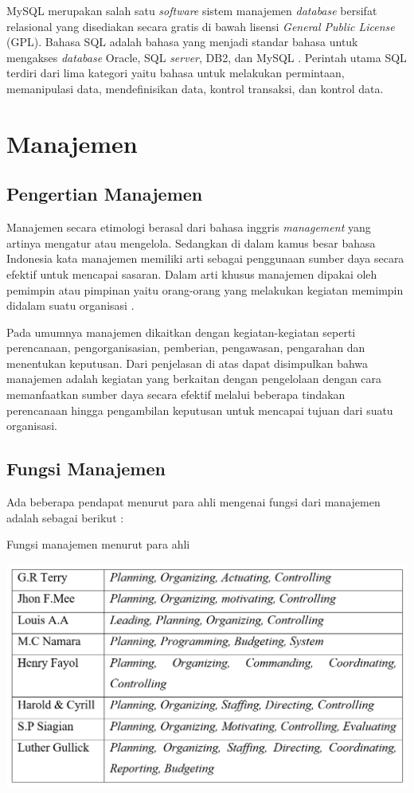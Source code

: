 MySQL merupakan salah satu \emph{software} sistem manajemen \emph{database} bersifat relasional yang disediakan secara gratis di bawah lisensi \emph{General Public License} (GPL). Bahasa SQL adalah bahasa yang menjadi standar bahasa untuk mengakses \emph{database} Oracle, SQL \emph{server}, DB2, dan MySQL \cite{andreea}. Perintah utama SQL terdiri dari lima kategori yaitu bahasa untuk melakukan permintaan, memanipulasi data, mendefinisikan data, kontrol transaksi, dan kontrol data. 

\section{Manajemen}

\subsection{Pengertian Manajemen}

Manajemen secara etimologi berasal dari bahasa inggris \emph{management} yang artinya mengatur atau mengelola. Sedangkan di dalam kamus besar bahasa Indonesia kata manajemen memiliki arti sebagai penggunaan sumber daya secara efektif untuk mencapai sasaran. Dalam arti khusus manajemen dipakai oleh pemimpin atau pimpinan yaitu orang-orang yang melakukan kegiatan memimpin didalam suatu organisasi \cite{syamsuddin}. 

Pada umumnya manajemen dikaitkan dengan kegiatan-kegiatan seperti perencanaan, pengorganisasian, pemberian, pengawasan, pengarahan dan menentukan keputusan. Dari penjelasan di atas dapat disimpulkan bahwa manajemen adalah kegiatan yang berkaitan dengan pengelolaan dengan cara memanfaatkan sumber daya secara efektif melalui beberapa tindakan perencanaan hingga pengambilan keputusan untuk mencapai tujuan dari suatu organisasi.

\subsection{Fungsi Manajemen}

Ada beberapa pendapat menurut para ahli mengenai fungsi dari manajemen adalah sebagai berikut \cite{rifai}: 

\begin{table}[H]
	\centering
	\caption{Fungsi manajemen menurut para ahli}
	\includegraphics[width=1.0\textwidth]{gambar/manajemenmenurutahli}
	\label{tabel_karaktermax2}
\end{table}

